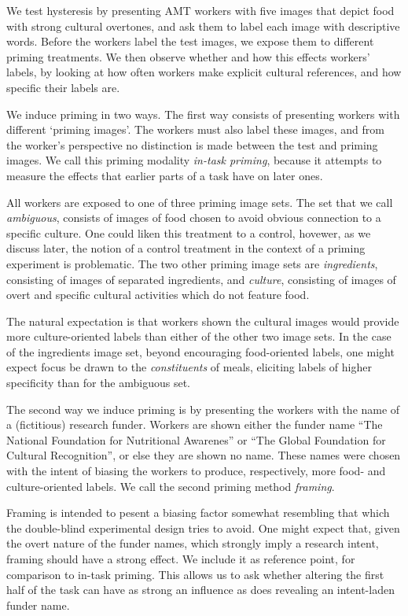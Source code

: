 \documentclass[a4paper]{report}
\begin{document}
We test hysteresis by presenting AMT workers with
five images that depict food with strong cultural overtones, and ask them to
label each image with descriptive words.  Before the workers label the test
images, we expose them to different priming treatments.  We then observe 
whether and how this effects workers' labels, by looking at how
often workers make explicit cultural references, and how specific their labels 
are.

We induce priming in two ways.  The first way consists of presenting 
workers with different `priming images'.  The workers must also label these 
images, and from the worker's perspective no distinction is
made between the test and priming images.  We call this 
priming modality \textit{in-task priming}, because it attempts to measure the
effects that earlier parts of a task have on later ones.  

All workers are exposed to 
one of three priming image sets.  The set that we call \textit{ambiguous},
consists of images of food chosen to avoid obvious connection to a 
specific culture.  One could liken this treatment to a control, hovewer, as
we discuss later, the notion of a control treatment in the context of a priming
experiment is problematic.  The two other priming image sets are 
\textit{ingredients}, consisting of images of separated ingredients, and 
\textit{culture}, consisting of images of overt and specific cultural 
activities which do not feature food.  

The natural expectation is that workers
shown the cultural images would provide more culture-oriented labels than
either of the other two image sets.  In the case of the ingredients image set,
beyond encouraging food-oriented labels, one might expect focus be drawn to 
the \textit{constituents} of meals, eliciting labels of higher specificity than
for the ambiguous set.

The second way we induce priming is by presenting the workers with the name 
of a (fictitious) research funder.  Workers are shown either the funder name  
``The National Foundation for Nutritional Awarenes'' or ``The Global
Foundation for Cultural Recognition'', or else they are shown no name.  These 
names were
chosen with the intent of biasing the workers to produce, respectively, more
food- and culture-oriented labels.  We call the second priming method 
\textit{framing}.

Framing is intended to pesent a biasing factor somewhat resembling that which 
the double-blind experimental design tries to avoid.  One might expect that, 
given the overt nature of the funder names, which strongly imply a research
intent, framing should have a strong effect.  We include it as reference point,
for comparison to in-task priming.  This allows us
to ask whether altering the first half of the task can have as strong an 
influence as does revealing an intent-laden funder name.
\end{document}
